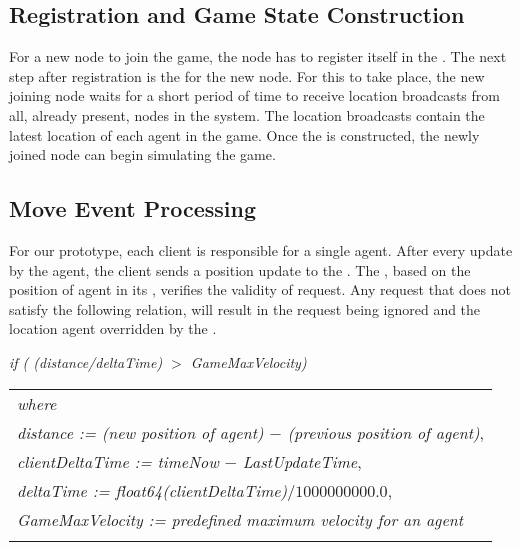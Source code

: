 \subsection{Registration and Game State Construction}


	For a new node to join the game, the node has to register itself in the \kvService. 
	The next step after registration is the \gameStateConstruction for the new node. For this to take place, the new joining node waits for a short period of time to receive location broadcasts from all, already present, nodes in the system. The location broadcasts contain the latest location of each agent in the game. Once the \gamestate is constructed, the newly joined node can begin simulating the game.	

\subsection{Move Event Processing}

	For our prototype, each client is responsible for a single agent. After every \gamestate update by the agent, the client sends a position update \move{\agent}{\position} to the \localServer. The \localServer, based on the position of agent in its \gamestate, verifies the validity of request. Any request that does not satisfy the following relation, will result in the request being ignored and the location agent overridden by the \localServer.


	\emph{if ( (distance/deltaTime) $>$ GameMaxVelocity) } \\
\begin{tabular}{l}
	\emph{where} \\ 
	\emph{distance := (new position of agent) $-$ (previous position of agent)}, \\
	\emph{clientDeltaTime := timeNow $-$ LastUpdateTime},  \\
	\emph{deltaTime := float64(clientDeltaTime)$/1000000000.0$}, \\
	\emph{GameMaxVelocity := predefined maximum velocity for an agent} \\
	\\
\end{tabular}	
	 

